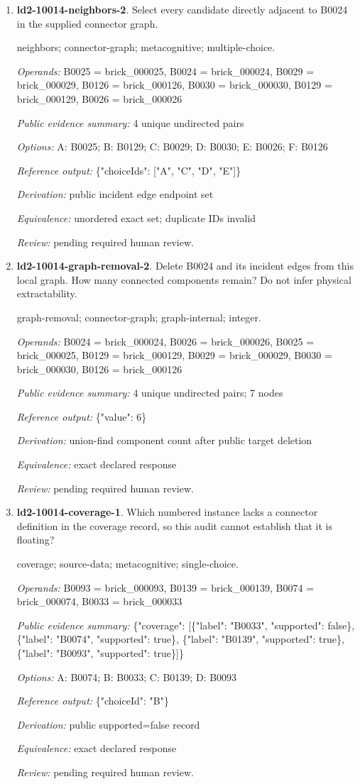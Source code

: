 \begin{enumerate}
\item \textbf{ld2-10014-neighbors-2}. Select every candidate directly adjacent to B0024 in the supplied connector graph.
\par{\small neighbors; connector-graph; metacognitive; multiple-choice.\par\textit{Operands:} B0025 = brick\_000025, B0024 = brick\_000024, B0029 = brick\_000029, B0126 = brick\_000126, B0030 = brick\_000030, B0129 = brick\_000129, B0026 = brick\_000026\par\textit{Public evidence summary:} 4 unique undirected pairs\par\textit{Options:} A: B0025; B: B0129; C: B0029; D: B0030; E: B0026; F: B0126\par\textit{Reference output:} \{"choiceIds": ["A", "C", "D", "E"]\}\par\textit{Derivation:} public incident edge endpoint set\par\textit{Equivalence:} unordered exact set; duplicate IDs invalid\par\textit{Review:} pending required human review.}
\item \textbf{ld2-10014-graph-removal-2}. Delete B0024 and its incident edges from this local graph. How many connected components remain? Do not infer physical extractability.
\par{\small graph-removal; connector-graph; graph-internal; integer.\par\textit{Operands:} B0024 = brick\_000024, B0026 = brick\_000026, B0025 = brick\_000025, B0129 = brick\_000129, B0029 = brick\_000029, B0030 = brick\_000030, B0126 = brick\_000126\par\textit{Public evidence summary:} 4 unique undirected pairs; 7 nodes\par\textit{Reference output:} \{"value": 6\}\par\textit{Derivation:} union-find component count after public target deletion\par\textit{Equivalence:} exact declared response\par\textit{Review:} pending required human review.}
\item \textbf{ld2-10014-coverage-1}. Which numbered instance lacks a connector definition in the coverage record, so this audit cannot establish that it is floating?
\par{\small coverage; source-data; metacognitive; single-choice.\par\textit{Operands:} B0093 = brick\_000093, B0139 = brick\_000139, B0074 = brick\_000074, B0033 = brick\_000033\par\textit{Public evidence summary:} \{"coverage": [\{"label": "B0033", "supported": false\}, \{"label": "B0074", "supported": true\}, \{"label": "B0139", "supported": true\}, \{"label": "B0093", "supported": true\}]\}\par\textit{Options:} A: B0074; B: B0033; C: B0139; D: B0093\par\textit{Reference output:} \{"choiceId": "B"\}\par\textit{Derivation:} public supported=false record\par\textit{Equivalence:} exact declared response\par\textit{Review:} pending required human review.}

\end{enumerate}
